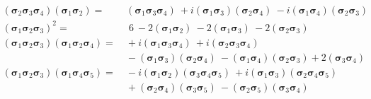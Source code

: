 \documentclass[portratit,a1paper,fontscale=0.58]{baposter} %
\newcommand{\ssigma}{{\boldsymbol{\sigma}}}
\begin{document}
\begin{poster}
{\begin{align}
  (\ssigma_2\ssigma_3\ssigma_4)(\ssigma_1\ssigma_2) =  &\
  (\ssigma_1\ssigma_3\ssigma_4)\
  +i(\ssigma_1\ssigma_3)(\ssigma_2\ssigma_4)\
  -i(\ssigma_1\ssigma_4)(\ssigma_2\ssigma_3)		%
  \\
  (\ssigma_1\ssigma_2\ssigma_3)^2 = &\,\,\,6\
  -2(\ssigma_1\ssigma_2)\
  -2(\ssigma_1\ssigma_3)\
  -2(\ssigma_2\ssigma_3)				%
  \\
  (\ssigma_1\ssigma_2\ssigma_3)(\ssigma_1\ssigma_2\ssigma_4) = &\
  +i(\ssigma_1\ssigma_3\ssigma_4)\
  +i(\ssigma_2\ssigma_3\ssigma_4) 		\nonumber\\  & \
  -(\ssigma_1\ssigma_3)(\ssigma_2\ssigma_4) \
  -(\ssigma_1\ssigma_4)(\ssigma_2\ssigma_3)
  +2 (\ssigma_3\ssigma_4)				%
  \\
  (\ssigma_1\ssigma_2\ssigma_3)(\ssigma_1\ssigma_4\ssigma_5) = & \
  -i(\ssigma_1 \ssigma_2)(\ssigma_3 \ssigma_4 \ssigma_5) \
  +i(\ssigma_1 \ssigma_3 )(\ssigma_2 \ssigma_4 \ssigma_5) \nonumber\\  & \
  +(\ssigma_2 \ssigma_4)(\ssigma_3 \ssigma_5)\
  -(\ssigma_2 \ssigma_5)(\ssigma_3 \ssigma_4) 		%
\end{align}
}


\end{poster}
\end{document}
